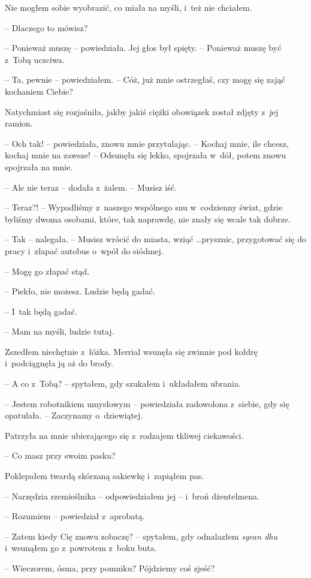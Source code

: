 \documentclass[oneside,polish,11pt,sfheadings]{mwbk}
\begin{document}
Nie mogłem sobie wyobrazić, co miała na myśli, i~też nie chciałem. 

-- Dlaczego to mówisz?

-- Ponieważ muszę -- powiedziała. Jej głos był spięty. -- Ponieważ muszę
być z~Tobą uczciwa.

-- Ta, pewnie -- powiedziałem. -- Cóż, już mnie ostrzegłaś, czy mogę się
zająć kochaniem Ciebie?

Natychmiast się rozjaśniła, jakby jakiś ciężki obowiązek został zdjęty z~jej ramion.

-- Och tak! -- powiedziała, znowu mnie przytulając. -- Kochaj mnie, ile
chcesz, kochaj mnie na zawsze! -- Odsunęła się lekko, spojrzała w~dół,
potem znowu spojrzała na mnie.

-- Ale nie teraz -- dodała z~żalem. -- Musisz iść.

-- Teraz?! -- Wypadliśmy z~naszego wspólnego snu w~codzienny świat, gdzie
byliśmy dwoma osobami, które, tak naprawdę, nie znały się wcale tak
dobrze.

-- Tak -- nalegała. -- Musisz wrócić do miasta, wziąć \ldots prysznic,
przygotować się do pracy i~złapać autobus o~wpół do siódmej.

-- Mogę go złapać stąd.

-- Piekło, nie możesz. Ludzie będą gadać.

-- I~tak będą gadać.

-- Mam na myśli, ludzie tutaj.

Zszedłem niechętnie z~łóżka. Merrial wsunęła się zwinnie pod kołdrę i~podciągnęła ją aż do brody.

-- A co z~Tobą? -- spytałem, gdy szukałem i~układałem ubrania.

-- Jestem robotnikiem umysłowym -- powiedziała zadowolona z~siebie, gdy
się opatulała. -- Zaczynamy o~dziewiątej.

Patrzyła na mnie ubierającego się z~rodzajem tkliwej ciekawości. 

-- Co
masz przy swoim pasku?

Poklepałem twardą skórzaną sakiewkę i~zapiąłem pas. 

-- Narzędzia
rzemieślnika -- odpowiedziałem jej -- i~broń dżentelmena.

-- Rozumiem -- powiedział z~aprobatą.

-- Zatem kiedy Cię znowu zobaczę? -- spytałem, gdy odnalazłem \textit{sgean
dhu} i~wsunąłem go z~powrotem z~boku buta.

-- Wieczorem, ósma, przy pomniku? Pójdziemy coś zjeść?
\end{document}
